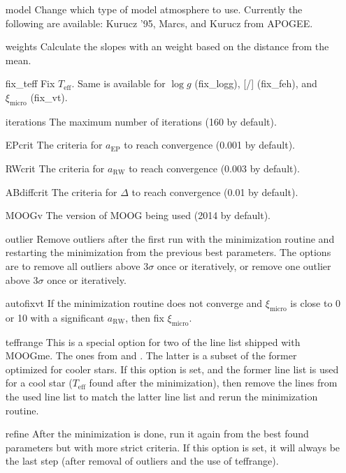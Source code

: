 \documentclass{aa}
\begin{document}
\begin{itemize}
    \item[model] Change which type of model atmosphere to use. Currently the
          following are available: Kurucz '95, Marcs, and Kurucz from APOGEE.
    \item[weights] Calculate the slopes with an weight based on the distance
          from the mean.
    \item[fix_teff] Fix $T_\mathrm{eff}$. Same is available for $\log g$
          (fix_logg), [/] (fix_feh), and $\xi_\mathrm{micro}$
          (fix_vt).
    \item[iterations] The maximum number of iterations (160 by default).
    \item[EPcrit] The criteria for $a_\mathrm{EP}$ to reach convergence (0.001
          by default).
    \item[RWcrit] The criteria for $a_\mathrm{RW}$ to reach convergence (0.003
          by default).
    \item[ABdiffcrit] The criteria for $\Delta$ to reach convergence
          (0.01 by default).
    \item[MOOGv] The version of MOOG being used (2014 by default).
    \item[outlier] Remove outliers after the first run with the minimization
          routine and restarting the minimization from the previous best
          parameters. The options are to remove all outliers above $3\sigma$
          once or iteratively, or remove one outlier above $3\sigma$ once or
          iteratively.
    \item[autofixvt] If the minimization routine does not converge and
          $\xi_\mathrm{micro}$ is close to 0 or 10 with a significant
          $a_\mathrm{RW}$, then fix $\xi_\mathrm{micro}$.
    \item[teffrange] This is a special option for two of the line list shipped
          with MOOGme. The ones from \citet{Sousa2015b} and \citet{Tsantaki2013}.
          The latter is a subset of the former optimized for cooler stars.
          If this option is set, and the former line list is used for a cool
          star ($T_\mathrm{eff}$ found after the minimization), then remove
          the lines from the used line list to match the latter line list and
          rerun the minimization routine.
    \item[refine] After the minimization is done, run it again from the best
          found parameters but with more strict criteria. If this option is set,
          it will always be the last step (after removal of outliers and the
          use of teffrange).
\end{itemize}
\end{document}
